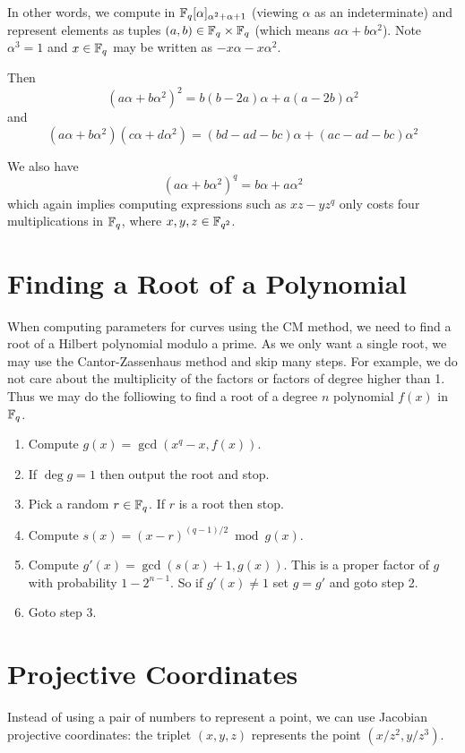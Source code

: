 In other words, we compute in $\mathbb{F}_q[\alpha]_{\alpha^2+\alpha+1}$
(viewing $\alpha$ as an indeterminate) and represent elements
as tuples $(a,b) \in \mathbb{F}_q \times \mathbb{F}_q$ (which means $a \alpha + b \alpha^2$).
Note $\alpha^3 = 1$ and $x\in\mathbb{F}_q$ may be written as $-x \alpha - x\alpha^2$.

Then
\[ (a \alpha + b \alpha^2)^2 = b(b-2a)\alpha + a(a-2b)\alpha^2 \]
and
\[ (a \alpha + b \alpha^2)(c \alpha + d \alpha^2) =
(bd-ad-bc)\alpha + (ac-ad-bc)\alpha^2 \]

We also have
\[ (a\alpha + b\alpha^2)^q = b\alpha + a\alpha^2 \]
which again implies computing expressions such as $x z - y z^q$ only
costs four multiplications in $\mathbb{F}_q$, where $x,y,z \in \mathbb{F}_{q^2}$.

\section{\label{sec:rootfinding}Finding a Root of a Polynomial}

When computing parameters for curves using the CM method, we
need to find a root of a Hilbert polynomial modulo a prime.
As we only want a single root, we may use the Cantor-Zassenhaus
method and skip many steps. For example, we do not care about
the multiplicity of the factors or factors of degree higher than 1.
Thus we may do the folliowing to find a root of a
degree $n$ polynomial $f(x)$ in
$\mathbb{F}_q$.

\begin{enumerate}
\item
Compute $g(x) = \gcd(x^q - x, f(x))$.
\item
If $\deg g = 1$ then output the root and stop.
\item
Pick a random $r \in \mathbb{F}_q$. If $r$ is a root then stop.
\item
Compute $s(x) = (x-r)^{(q-1)/2} \bmod g(x)$.
\item
Compute $g'(x) = \gcd(s(x)+1, g(x))$. This is a proper factor of $g$
with probability $1 - 2^{n-1}$. So if $g'(x) \ne 1$ set $g = g'$ and
goto step 2.
\item
Goto step 3.
\end{enumerate}

\section {\label{sec:projcoord}Projective Coordinates}

Instead of using a pair of numbers to represent a point,
we can use Jacobian projective coordinates: the triplet
$(x,y,z)$ represents the point $(x/z^2, y/z^3)$.

